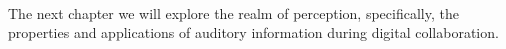\paragraph[Bridge]{}
The next chapter we will explore the realm of perception, specifically, the properties and applications of auditory information during digital collaboration.

